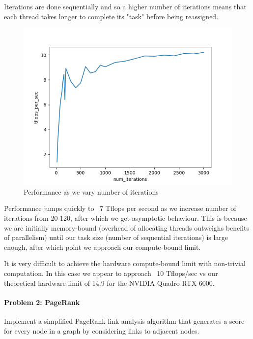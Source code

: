 \documentclass[12pt,letterpaper,twoside]{article}
\begin{document}
\begin{itemize}
    Iterations are done sequentially and so a higher number of 
    iterations means that each thread takes longer to complete 
    its "task" before being reassigned. 
    
    \begin{figure}[h]
        \center
        \includegraphics[scale=0.7]{q1_6.png}
        \caption{Performance as we vary number of iterations}
    \end{figure}

    Performance jumps quickly to ~7 Tflops per second as we increase
    number of iterations from 20-120, after which we get asymptotic 
    behaviour. This is because we are initially memory-bound (overhead
    of allocating threads outweighs benefits of parallelism) until 
    our task size (number of sequential iterations) is large enough,
    after which point we approach our compute-bound limit.
    
    It is very difficult to achieve the hardware compute-bound limit 
    with non-trivial computation. In this case we appear to approach 
    ~10 Tflops/sec vs our theoretical hardware limit of 14.9 for the 
    NVIDIA Quadro RTX 6000.
    
\end{itemize}


\paragraph{Problem 2: PageRank} Implement a simplified PageRank link analysis
algorithm that generates a score for every node in a graph by considering 
links to adjacent nodes.
\end{document}
